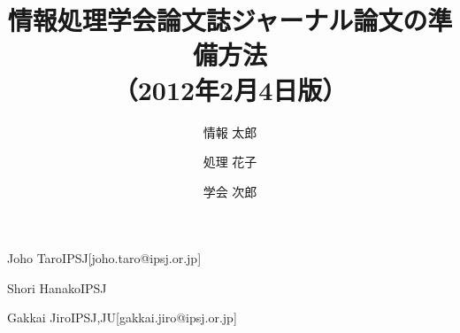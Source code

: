\title{情報処理学会論文誌ジャーナル論文の準備方法\\
（2012年2月4日版）}







\author{情報 太郎}{Joho Taro}{IPSJ}[joho.taro@ipsj.or.jp]
\author{処理 花子}{Shori Hanako}{IPSJ}
\author{学会 次郎}{Gakkai Jiro}{IPSJ,JU}[gakkai.jiro@ipsj.or.jp]





\maketitle
